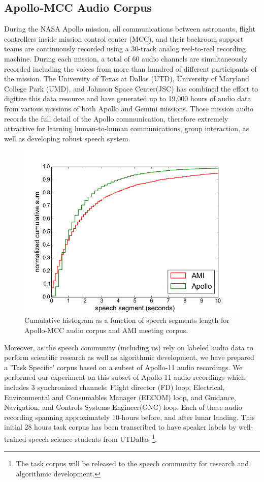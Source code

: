\documentclass[journal]{IEEEtran}
\begin{document}
\subsection{Apollo-MCC Audio Corpus}
\label{apollo}
During the NASA Apollo mission, all communications between astronauts, flight controllers inside mission control center (MCC), and their backroom support teams are continuously recorded using a 30-track analog reel-to-reel recording machine. During each mission, a total of 60 audio channels are simultaneously recorded including the voices from more than hundred of different participants of the mission. The University of Texas at Dallas (UTD), University of Maryland College Park (UMD), and Johnson Space Center(JSC) has combined the effort to digitize this data resource and have generated up to 19,000 hours of audio data from various missions of both Apollo and Gemini missions. Those mission audio records the full detail of the Apollo communication, therefore extremely attractive for learning human-to-human communications, group interaction, as well as developing robust speech system. 

\begin{figure}[t]
	\includegraphics[width=\linewidth]{figs/lens}
	\caption{Cumulative histogram as a function of speech segments length for Apollo-MCC audio corpus and AMI meeting corpus.}
	\label{fig:cumu}
\end{figure}

Moreover, as the speech community (including us) rely on labeled audio data to perform scientific research as well as algorithmic development, we have prepared a 'Task Specific' corpus based on a subset of Apollo-11 audio recordings. We performed our experiment on this subset of Apollo-11 audio recordings which includes 3 synchronized channels: Flight director (FD) loop, Electrical, Environmental and Consumables Manager (EECOM) loop, and Guidance, Navigation, and Controls Systems Engineer(GNC) loop.  Each of these audio recording spanning approximately 10-hours before, and after lunar landing. This initial 28 hours task corpus has been transcribed to have speaker labels by well-trained speech science students from UTDallas \footnote{The task corpus will be released to the speech community for research and algorithmic development.}.
\end{document}
